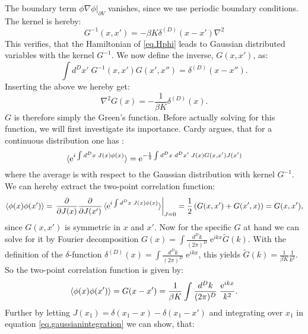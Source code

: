 The boundary term $\left.\phi\nabla\phi\right|_{\partial V}$ vanishes, since we use periodic boundary conditions. The kernel is hereby: 
\begin{equation}
G^{-1}(x,x') = -\beta K \delta^{(D)}(x - x')\nabla^2 \nonumber
\end{equation}
This verifies, that the Hamiltonian of \eqref{eq.Hphi} leads to Gaussian distributed variables with the kernel $G^{-1}$. We now define the inverse, $G(x,x')$, as:
\begin{equation}
\int d^{D}x' \; G^{-1}(x,x')G(x',x'') = \delta^{(D)}(x - x''). \nonumber
\end{equation}
Inserting the above we hereby get:
\begin{equation}
\nabla^2G(x) = -\frac{1}{\beta K} \delta^{(D)}(x). \nonumber
\end{equation}
$G$ is therefore simply the Green's function. Before actually solving for this function, we will first investigate its importance. Cardy argues, that for a continuous distribution one has \cite[p. 227]{Cardy.StatPhys}: 
\begin{equation}
\braket{\text{e}^{i\int d^{D}x\; J(x) \phi(x)}} = \text{e}^{ -\frac{1}{2}\int d^{D}x\; d^{D}x'\; J(x) G(x,x') J(x')  }
\label{eq.gaussianintegration}
\end{equation}
where the average is with respect to the Gaussian distribution with kernel $G^{-1}$. We can hereby extract the two-point correlation function:
\begin{equation}
\braket{\phi(x)\phi(x')} = \left. \frac{\partial}{\partial J(x)}\frac{\partial}{\partial J(x')} \braket{\text{e}^{i\int d^{D}x\; J(x) \phi(x)}}\right|_{J = 0} = \frac{1}{2}\left(G(x, x') + G(x', x)\right) = G(x, x'), \nonumber
\end{equation} 
since $G(x,x')$ is symmetric in $x$ and $x'$. Now for the specific $G$ at hand we can solve for it by Fourier decomposition $G(x) = \int \frac{d^{D}k}{(2\pi)^D}\; \text{e}^{ikx} \tilde{G}(k)$. With the definition of the $\delta$-function $\delta^{(D)}(x) = \int \frac{d^{D}k}{(2\pi)^D}\; \text{e}^{ikx}$, this yields $\tilde{G}(k) = \frac{1}{\beta K}\frac{1}{k^2}$. So the two-point correlation function is given by: 
\begin{equation}
\braket{\phi(x)\phi(x')} = G(x - x') = \frac{1}{\beta K}\int \frac{d^{D}k}{(2\pi)^D}\; \frac{\text{e}^{ikx}}{k^2}. 
\label{eq.anglecorrelationfunction.generaldimension}
\end{equation} 
Further by letting $J(x_1) = \delta(x_1 - x) - \delta(x_1 - x')$ and integrating over $x_1$ in equation \eqref{eq.gaussianintegration} we can show, that:
